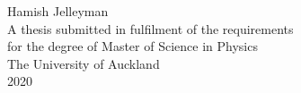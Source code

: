 \documentclass[../main.tex]{subfiles}
\begin{document}
\begin{titlepage} \vspace{20mm} \centering
{\Huge\textbf{}\par}  \vspace{20mm} {\Large Hamish Jelleyman} \vspace{20mm} \\ \vspace{20mm} A thesis submitted in fulfilment of the requirements \\ for the degree of Master of Science in Physics \\ \vspace{20mm} The University of Auckland \\ 2020
\end{titlepage}



\tableofcontents

\listoftodos
\end{document}
